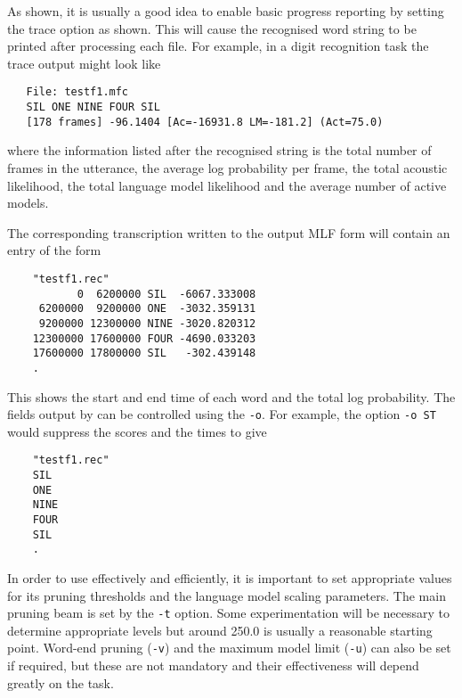 As shown, it is usually a good idea to enable basic progress reporting
by setting the trace option as shown.  This will cause the recognised
word string to be printed after processing each file.  For example,
in a digit recognition task the trace output might look like
\begin{verbatim}
   File: testf1.mfc
   SIL ONE NINE FOUR SIL 
   [178 frames] -96.1404 [Ac=-16931.8 LM=-181.2] (Act=75.0)
\end{verbatim}
where the information listed after the recognised string is the total
number of frames in the utterance, the average 
log probability per frame,
the total acoustic likelihood, the total language model likelihood and
the average number of active models.

The corresponding transcription
written to the output MLF form will contain an entry of the form

\begin{verbatim}
    "testf1.rec"
           0  6200000 SIL  -6067.333008
     6200000  9200000 ONE  -3032.359131
     9200000 12300000 NINE -3020.820312
    12300000 17600000 FOUR -4690.033203
    17600000 17800000 SIL   -302.439148
    .   
\end{verbatim}
This shows the start and end time of each word and the total log probability.
The fields output by  can be controlled using 
the \texttt{-o}.  For example, the option \texttt{-o ST} would suppress
the scores and the times to give
\begin{verbatim}
    "testf1.rec"
    SIL 
    ONE
    NINE
    FOUR
    SIL 
    .   
\end{verbatim}

In order to use  effectively and efficiently, it is important to 
set appropriate values for its pruning thresholds and the language model
scaling parameters.   The main pruning beam is set by the  \texttt{-t} option.
Some experimentation will be necessary to determine appropriate levels
but around 250.0 is usually a reasonable starting point.  Word-end pruning
(\texttt{-v}) and the maximum model limit (\texttt{-u}) can also be set
if required, but these are not mandatory and their effectiveness will
depend greatly on the task.

